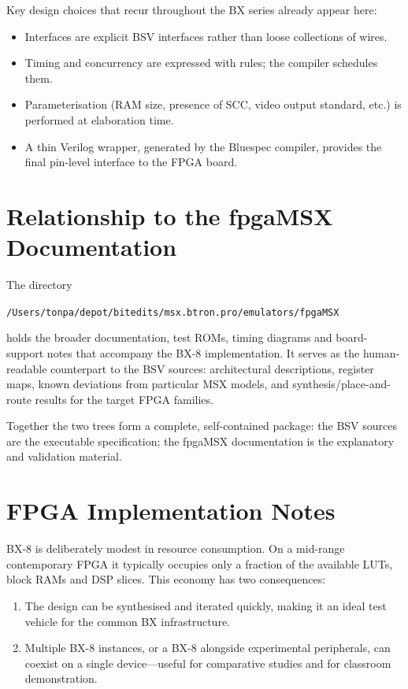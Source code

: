 \documentclass[11pt,a4paper]{article}
\begin{document}
Key design choices that recur throughout the BX series already appear here:
\begin{itemize}[leftmargin=1.5em]
  \item Interfaces are explicit BSV interfaces rather than loose collections of wires.
  \item Timing and concurrency are expressed with rules; the compiler schedules them.
  \item Parameterisation (RAM size, presence of SCC, video output standard, etc.) is performed at elaboration time.
  \item A thin Verilog wrapper, generated by the Bluespec compiler, provides the final pin-level interface to the FPGA board.
\end{itemize}

\section{Relationship to the fpgaMSX Documentation}

The directory
\begin{center}
\texttt{/Users/tonpa/depot/bitedits/msx.btron.pro/emulators/fpgaMSX}
\end{center}
holds the broader documentation, test ROMs, timing diagrams and board-support notes that accompany the BX-8 implementation. It serves as the human-readable counterpart to the BSV sources: architectural descriptions, register maps, known deviations from particular MSX models, and synthesis/place-and-route results for the target FPGA families.

Together the two trees form a complete, self-contained package: the BSV sources are the executable specification; the fpgaMSX documentation is the explanatory and validation material.

\section{FPGA Implementation Notes}

BX-8 is deliberately modest in resource consumption. On a mid-range contemporary FPGA it typically occupies only a fraction of the available LUTs, block RAMs and DSP slices. This economy has two consequences:
\begin{enumerate}[leftmargin=1.5em]
  \item The design can be synthesised and iterated quickly, making it an ideal test vehicle for the common BX infrastructure.
  \item Multiple BX-8 instances, or a BX-8 alongside experimental peripherals, can coexist on a single device---useful for comparative studies and for classroom demonstration.
\end{enumerate}
\end{document}
